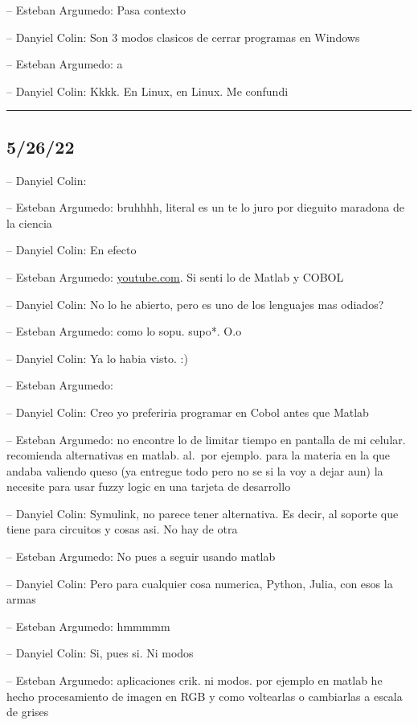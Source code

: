 -- Esteban Argumedo: Pasa contexto

-- Danyiel Colin: Son 3 modos clasicos de cerrar programas en Windows

-- Esteban Argumedo: a

-- Danyiel Colin: Kkkk. En Linux, en Linux. Me confundi

\begin{center}\rule{0.5\linewidth}{0.5pt}\end{center}

\hypertarget{section-86}{%
\subsection{5/26/22}\label{section-86}}

-- Danyiel Colin:

-- Esteban Argumedo: bruhhhh, literal es un te lo juro por dieguito
maradona de la ciencia

-- Danyiel Colin: En efecto

-- Esteban Argumedo:
\href{https://youtube.com/shorts/wvqbKGZOSVg?feature=share}{youtube.com}.
Si senti lo de Matlab y COBOL

-- Danyiel Colin: No lo he abierto, pero es uno de los lenguajes mas
odiados?

-- Esteban Argumedo: como lo sopu. supo*. O.o

-- Danyiel Colin: Ya lo habia visto. :)

-- Esteban Argumedo:

-- Danyiel Colin: Creo yo preferiria programar en Cobol antes que Matlab

-- Esteban Argumedo: no encontre lo de limitar tiempo en pantalla de mi
celular. recomienda alternativas en matlab. al.~por ejemplo. para la
materia en la que andaba valiendo queso (ya entregue todo pero no se si
la voy a dejar aun) la necesite para usar fuzzy logic en una tarjeta de
desarrollo

-- Danyiel Colin: Symulink, no parece tener alternativa. Es decir, al
soporte que tiene para circuitos y cosas asi. No hay de otra

-- Esteban Argumedo: No pues a seguir usando matlab

-- Danyiel Colin: Pero para cualquier cosa numerica, Python, Julia, con
esos la armas

-- Esteban Argumedo: hmmmmm

-- Danyiel Colin: Si, pues si. Ni modos

-- Esteban Argumedo: aplicaciones crik. ni modos. por ejemplo en matlab
he hecho procesamiento de imagen en RGB y como voltearlas o cambiarlas a
escala de grises

